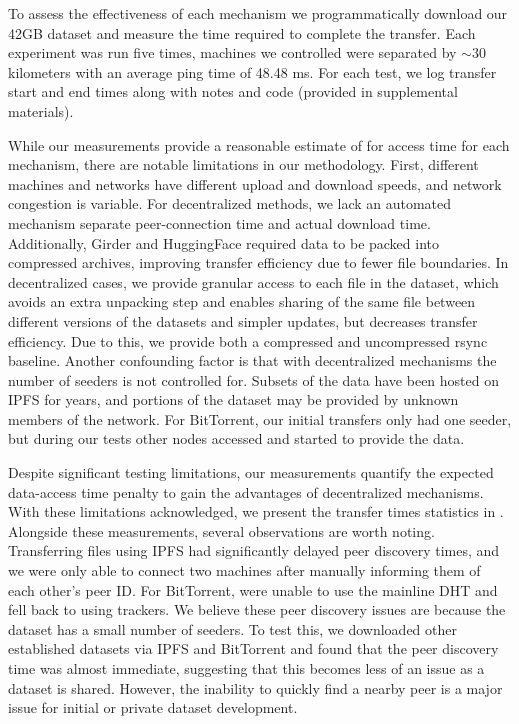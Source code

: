 \documentclass{article}
\begin{document}
To assess the effectiveness of each mechanism we programmatically download our 42GB dataset and measure the
  time required to complete the transfer.
Each experiment was run five times, machines we controlled were separated by $\sim\!30$ kilometers
  with an average ping time of 48.48 ms.
For each test, we log transfer start and end times along with notes and code (provided in supplemental
  materials).

While our measurements provide a reasonable estimate of for access time for each mechanism, there are
  notable limitations in our methodology.
First, different machines and networks have different upload and download speeds, and network congestion is
  variable.
For decentralized methods, we lack an automated mechanism separate peer-connection time and actual download
  time.
Additionally, Girder and HuggingFace required data to be packed into compressed archives, improving transfer
  efficiency due to fewer file boundaries.
In decentralized cases, we provide granular access to each file in the dataset, which avoids an extra
  unpacking step and enables sharing of the same file between different versions of the datasets and simpler
  updates, but decreases transfer efficiency.
Due to this, we provide both a compressed and uncompressed rsync baseline.
Another confounding factor is that with decentralized mechanisms the number of seeders is not controlled
  for.
Subsets of the data have been hosted on IPFS for years, and portions of the dataset may be provided by
  unknown members of the network.
For BitTorrent, our initial transfers only had one seeder, but during our tests other nodes accessed and
  started to provide the data.

Despite significant testing limitations, our measurements quantify the expected data-access time penalty to
  gain the advantages of decentralized mechanisms.
With these limitations acknowledged, we present the transfer times statistics in .
Alongside these measurements, several observations are worth noting.
Transferring files using IPFS had significantly delayed peer discovery times, and we were only able to
  connect two machines after manually informing them of each other's peer ID.
For BitTorrent, were unable to use the mainline DHT and fell back to using trackers.
We believe these peer discovery issues are because the dataset has a small number of seeders.
To test this, we downloaded other established datasets via IPFS and BitTorrent and found that the peer
  discovery time was almost immediate, suggesting that this becomes less of an issue as a dataset is shared.
However, the inability to quickly find a nearby peer is a major issue for initial or private dataset
  development.
\end{document}
